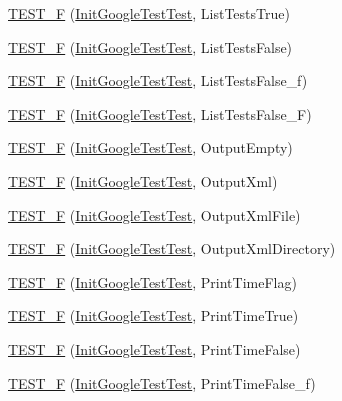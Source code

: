 \begin{DoxyCompactItemize}
\item 
\hyperlink{namespacetesting_a000181c6b1ac347a3d7797324808ea8d}{T\+E\+S\+T\+\_\+F} (\hyperlink{classtesting_1_1_init_google_test_test}{Init\+Google\+Test\+Test}, List\+Tests\+True)
\item 
\hyperlink{namespacetesting_acc2334b947370b550b7d6241e0d34124}{T\+E\+S\+T\+\_\+F} (\hyperlink{classtesting_1_1_init_google_test_test}{Init\+Google\+Test\+Test}, List\+Tests\+False)
\item 
\hyperlink{namespacetesting_a60e2b7e1cf88c2af6e04055b3afe7cbe}{T\+E\+S\+T\+\_\+F} (\hyperlink{classtesting_1_1_init_google_test_test}{Init\+Google\+Test\+Test}, List\+Tests\+False\+\_\+f)
\item 
\hyperlink{namespacetesting_a4933b012108ecb88243c2dbc13d7665b}{T\+E\+S\+T\+\_\+F} (\hyperlink{classtesting_1_1_init_google_test_test}{Init\+Google\+Test\+Test}, List\+Tests\+False\+\_\+F)
\item 
\hyperlink{namespacetesting_a121894d4edf72b1dbabdcde2bebd745d}{T\+E\+S\+T\+\_\+F} (\hyperlink{classtesting_1_1_init_google_test_test}{Init\+Google\+Test\+Test}, Output\+Empty)
\item 
\hyperlink{namespacetesting_a90df70c45f67d4c0dbc5bd29f7be3361}{T\+E\+S\+T\+\_\+F} (\hyperlink{classtesting_1_1_init_google_test_test}{Init\+Google\+Test\+Test}, Output\+Xml)
\item 
\hyperlink{namespacetesting_a810f99da1185404f8a899c919ee6433e}{T\+E\+S\+T\+\_\+F} (\hyperlink{classtesting_1_1_init_google_test_test}{Init\+Google\+Test\+Test}, Output\+Xml\+File)
\item 
\hyperlink{namespacetesting_ac351c3065ee89f7eb2fbba809db5c61d}{T\+E\+S\+T\+\_\+F} (\hyperlink{classtesting_1_1_init_google_test_test}{Init\+Google\+Test\+Test}, Output\+Xml\+Directory)
\item 
\hyperlink{namespacetesting_aa832ff8ffe6b687c7025cbc766973e0b}{T\+E\+S\+T\+\_\+F} (\hyperlink{classtesting_1_1_init_google_test_test}{Init\+Google\+Test\+Test}, Print\+Time\+Flag)
\item 
\hyperlink{namespacetesting_ae0f76bbca8e2bf7d9de60c4b8b0dfa16}{T\+E\+S\+T\+\_\+F} (\hyperlink{classtesting_1_1_init_google_test_test}{Init\+Google\+Test\+Test}, Print\+Time\+True)
\item 
\hyperlink{namespacetesting_a1ec71efef2639ccb137ac5b7ccd8c9d1}{T\+E\+S\+T\+\_\+F} (\hyperlink{classtesting_1_1_init_google_test_test}{Init\+Google\+Test\+Test}, Print\+Time\+False)
\item 
\hyperlink{namespacetesting_af87ac7e6dc7c0ea1d85eaa3a57358d29}{T\+E\+S\+T\+\_\+F} (\hyperlink{classtesting_1_1_init_google_test_test}{Init\+Google\+Test\+Test}, Print\+Time\+False\+\_\+f)

\end{DoxyCompactItemize}
